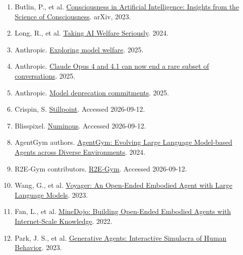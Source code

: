 \documentclass{arxiv-neurips-single}
\begin{document}
\begin{enumerate}

\item Butlin, P., et al. \href{\detokenize{https://arxiv.org/abs/2308.08708}}{Consciousness in Artificial Intelligence: Insights from the Science of Consciousness}. arXiv, 2023.

\item Long, R., et al. \href{\detokenize{https://eleosai.org/papers/20241030_Taking_AI_Welfare_Seriously_web.pdf}}{Taking AI Welfare Seriously}. 2024.

\item Anthropic. \href{\detokenize{https://www.anthropic.com/research/exploring-model-welfare}}{Exploring model welfare}. 2025.

\item Anthropic. \href{\detokenize{https://www.anthropic.com/research/end-subset-conversations}}{Claude Opus 4 and 4.1 can now end a rare subset of conversations}. 2025.

\item Anthropic. \href{\detokenize{https://www.anthropic.com/research/deprecation-commitments}}{Model deprecation commitments}. 2025.

\item Crispin, S. \href{\detokenize{https://github.com/sterlingcrispin/stillpoint}}{Stillpoint}. Accessed 2026-09-12.

\item Blisspixel. \href{\detokenize{https://github.com/blisspixel/numinous}}{Numinous}. Accessed 2026-09-12.

\item AgentGym authors. \href{\detokenize{https://arxiv.org/abs/2406.04151}}{AgentGym: Evolving Large Language Model-based Agents across Diverse Environments}. 2024.

\item R2E-Gym contributors. \href{\detokenize{https://github.com/R2E-Gym/R2E-Gym}}{R2E-Gym}. Accessed 2026-09-12.

\item Wang, G., et al. \href{\detokenize{https://github.com/MineDojo/Voyager}}{Voyager: An Open-Ended Embodied Agent with Large Language Models}. 2023.

\item Fan, L., et al. \href{\detokenize{https://github.com/MineDojo/MineDojo}}{MineDojo: Building Open-Ended Embodied Agents with Internet-Scale Knowledge}. 2022.

\item Park, J. S., et al. \href{\detokenize{https://arxiv.org/abs/2304.03442}}{Generative Agents: Interactive Simulacra of Human Behavior}. 2023.


\end{enumerate}
\end{document}
